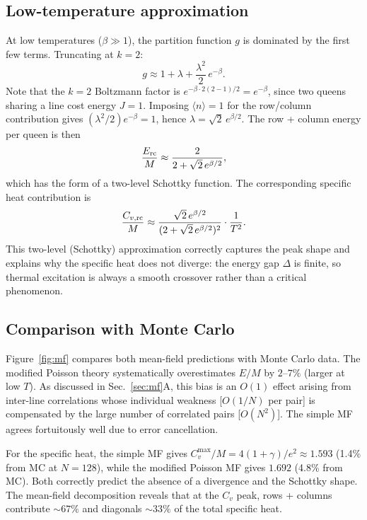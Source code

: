\documentclass[aps, pre, reprint, amsmath, amssymb, superscriptaddress, floatfix]{revtex4-2}
\begin{document}
\subsection{Low-temperature approximation}

At low temperatures ($\beta \gg 1$), the partition function $g$ is
dominated by the first few terms.  Truncating at $k = 2$:
\begin{equation}
  g \approx 1 + \lambda + \frac{\lambda^2}{2}\,e^{-\beta}.
  \label{eq:g_trunc}
\end{equation}
Note that the $k = 2$ Boltzmann factor is $e^{-\beta \cdot 2(2-1)/2}
= e^{-\beta}$, since two queens sharing a line cost energy $J = 1$.
Imposing $\langle n \rangle = 1$ for the row/column contribution
gives $(\lambda^2/2)e^{-\beta} = 1$, hence
$\lambda = \sqrt{2}\,e^{\beta/2}$.
The row + column energy per queen is then
\begin{equation}
  \frac{E_{\rm rc}}{M} \approx \frac{2}{2 + \sqrt{2}\,e^{\beta/2}},
  \label{eq:Erc_approx}
\end{equation}
which has the form of a two-level Schottky function.  The
corresponding specific heat contribution is
\begin{equation}
  \frac{C_{v,\rm rc}}{M} \approx
  \frac{\sqrt{2}\,e^{\beta/2}}{(2 + \sqrt{2}\,e^{\beta/2})^2}
  \cdot \frac{1}{T^2}.
  \label{eq:Cv_rc_approx}
\end{equation}
This two-level (Schottky) approximation correctly captures the peak
shape and explains why the specific heat does not diverge: the
energy gap $\Delta$ is finite, so thermal excitation is always a
smooth crossover rather than a critical phenomenon.

\subsection{Comparison with Monte Carlo}

Figure~\ref{fig:mf} compares both mean-field predictions with Monte
Carlo data.  The modified Poisson theory systematically overestimates
$E/M$ by $2$--$7\%$ (larger at low $T$).
As discussed in Sec.~\ref{sec:mf}A, this bias is an $O(1)$
effect arising from inter-line correlations whose individual weakness
[$O(1/N)$ per pair] is compensated by the large number of correlated
pairs [$O(N^2)$].  The simple MF agrees
fortuitously well due to error cancellation.

For the specific heat, the simple MF gives
$C_v^{\max}/M = 4(1+\gamma)/e^2 \approx 1.593$ (1.4\% from MC at $N = 128$),
while the modified Poisson MF gives $1.692$ (4.8\% from MC).  Both
correctly predict the absence of a divergence and the Schottky shape.
The mean-field decomposition reveals that at the $C_v$ peak,
rows + columns contribute $\sim 67\%$ and diagonals $\sim 33\%$ of
the total specific heat.
\end{document}
